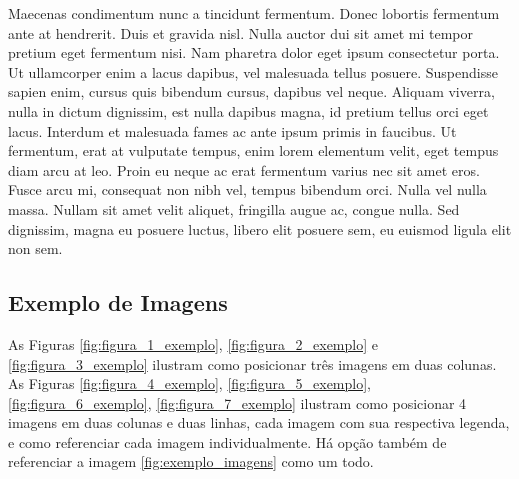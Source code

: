 Maecenas condimentum nunc a tincidunt fermentum. Donec lobortis fermentum ante at hendrerit. Duis et gravida nisl. Nulla auctor dui sit amet mi tempor pretium eget fermentum nisi. Nam pharetra dolor eget ipsum consectetur porta. Ut ullamcorper enim a lacus dapibus, vel malesuada tellus posuere. Suspendisse sapien enim, cursus quis bibendum cursus, dapibus vel neque. Aliquam viverra, nulla in dictum dignissim, est nulla dapibus magna, id pretium tellus orci eget lacus. Interdum et malesuada fames ac ante ipsum primis in faucibus. Ut fermentum, erat at vulputate tempus, enim lorem elementum velit, eget tempus diam arcu at leo. Proin eu neque ac erat fermentum varius nec sit amet eros. Fusce arcu mi, consequat non nibh vel, tempus bibendum orci. Nulla vel nulla massa. Nullam sit amet velit aliquet, fringilla augue ac, congue nulla. Sed dignissim, magna eu posuere luctus, libero elit posuere sem, eu euismod ligula elit non sem.

\subsection{Exemplo de Imagens}

As Figuras \ref{fig:figura_1_exemplo}, \ref{fig:figura_2_exemplo} e \ref{fig:figura_3_exemplo} ilustram como posicionar tr\^{e}s imagens em duas colunas. As Figuras \ref{fig:figura_4_exemplo}, \ref{fig:figura_5_exemplo}, \ref{fig:figura_6_exemplo}, \ref{fig:figura_7_exemplo} ilustram como posicionar 4 imagens em duas colunas e duas linhas, cada imagem com sua respectiva legenda, e como referenciar cada imagem individualmente. H\'{a} op\c{c}\~{a}o tamb\'{e}m de referenciar a imagem \ref{fig:exemplo_imagens} como um todo.

